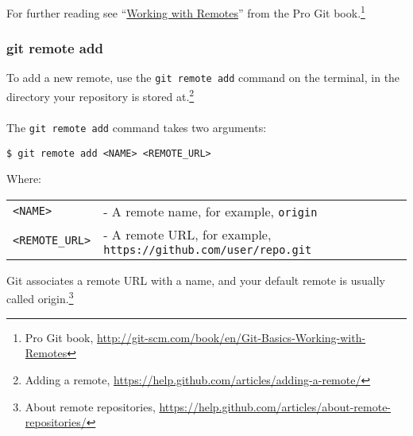 \documentclass[12pt,letterpaper,dvips]{article}
\newcommand{\cmd}[1]{\texttt{#1}}
\begin{document}
\noindent For further reading see ``\href{http://git-scm.com/book/en/Git-Basics-Working-with-Remotes}{Working with Remotes}''
from the Pro Git book.\footnote{Pro Git book, \href{http://git-scm.com/book/en/Git-Basics-Working-with-Remotes}{http://git-scm.com/book/en/Git-Basics-Working-with-Remotes}}


\newpage
\subsubsection{git remote add}
To add a new remote, use the \cmd{git remote add} command on the
terminal, in the directory your repository is stored at.\footnote{Adding a remote,
\href{https://help.github.com/articles/adding-a-remote/}{https://help.github.com/articles/adding-a-remote/}}
\\
\\
The \cmd{git remote add} command takes two arguments:
\vspace{-10pt}
\begin{verbatim}
$ git remote add <NAME> <REMOTE_URL> 
\end{verbatim}

\noindent Where:
\vspace{-10pt}
\begin{table}[htb]
\begin{center}
\begin{tabular}{p{}p{}}
\hspace{20pt}\cmd{<NAME>}&- A remote name, for example, \cmd{origin}\\
\hspace{20pt}\cmd{<REMOTE\_URL>}&- A remote URL, for example, \cmd{https://github.com/user/repo.git}\\
\end{tabular}
\label{table:remote_add}
\end{center}
\end{table}

\vspace{-20pt}
\noindent Git associates a remote URL with a name, and your
default remote is usually called origin.\footnote{About remote repositories,
\href{https://help.github.com/articles/about-remote-repositories/}{https://help.github.com/articles/about-remote-repositories/}}
\\
\end{document}
